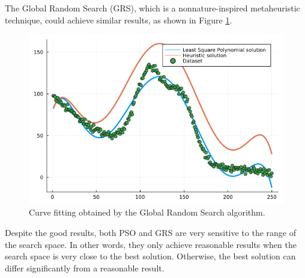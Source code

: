 \documentclass[12pt,a4paper]{article}
\begin{document}
The Global Random Search (GRS), which is a nonnature-inspired metaheuristic technique, could achieve similar results, as shown in Figure \ref{fig:global-random-search-fit}.

\begin{figure}[H]
    \centering
    \includegraphics[scale=0.35]{../figs/grs_regression_result.png}
    \caption{Curve fitting obtained by the Global Random Search algorithm.}
    \label{fig:global-random-search-fit}
\end{figure}

Despite the good results, both PSO and GRS are very sensitive to the range of the search space. In other words, they only achieve reasonable results when the search space is very close to the best solution. Otherwise, the best solution can differ significantly from a reasonable result.



\end{document}
